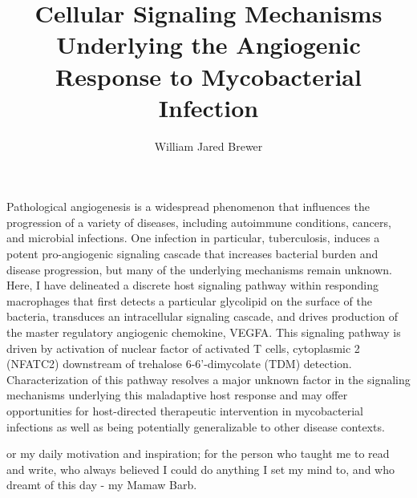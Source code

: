 \documentclass[PhD]{dukethesis2006}
\author{William Jared Brewer}
\title{Cellular Signaling Mechanisms Underlying the Angiogenic Response to Mycobacterial Infection}
\begin{document}
{\parskip=0pt \maketitle}

{\parskip=0pt \makeabstract}

\Copyright

\begin{doublespace}

\abstract

Pathological angiogenesis is a widespread phenomenon that influences the progression of a variety of diseases, including autoimmune conditions, cancers, and microbial infections. One infection in particular, tuberculosis, induces a potent pro-angiogenic signaling cascade that increases bacterial burden and disease progression, but many of the underlying mechanisms remain unknown. Here, I have delineated a discrete host signaling pathway within responding macrophages that first detects a particular glycolipid on the surface of the bacteria, transduces an intracellular signaling cascade, and drives production of the master regulatory angiogenic chemokine, VEGFA. This signaling pathway is driven by activation of nuclear factor of activated T cells, cytoplasmic 2 (NFATC2) downstream of trehalose 6-6'-dimycolate (TDM) detection. Characterization of this pathway resolves a major unknown factor in the signaling mechanisms underlying this maladaptive host response and may offer opportunities for host-directed therapeutic intervention in mycobacterial infections as well as being potentially generalizable to other disease contexts.

\dedication

For my daily motivation and inspiration; for the person who taught me to read and write, who always believed I could do anything I set my mind to, and who dreamt of this day - my Mamaw Barb.

\end{doublespace}

\listoftables

\listoffigures
\end{document}
